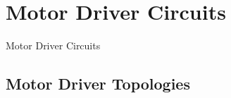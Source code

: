 \documentclass{beamer}
\begin{document}
\begin{frame}
\titlepage

\setcounter{tocdepth}{1}
\tableofcontents
\end{frame}


\section{Motor Driver Circuits} %
\begin{frame}
\centering \huge Motor Driver Circuits
\end{frame}


\subsection{Motor Driver Topologies}
\end{document}
